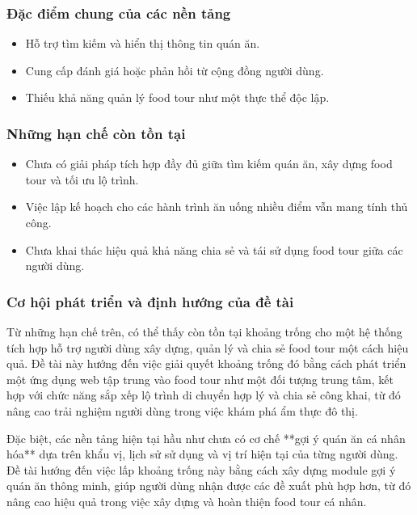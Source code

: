 \subsubsection{Đặc điểm chung của các nền tảng}
\begin{itemize}[label=\textbullet]
    \item Hỗ trợ tìm kiếm và hiển thị thông tin quán ăn.
    \item Cung cấp đánh giá hoặc phản hồi từ cộng đồng người dùng.
    \item Thiếu khả năng quản lý food tour như một thực thể độc lập.
\end{itemize}
\subsubsection{Những hạn chế còn tồn tại}
\begin{itemize}[label=\textbullet]
    \item Chưa có giải pháp tích hợp đầy đủ giữa tìm kiếm quán ăn, xây dựng food tour và tối ưu lộ trình.
    \item Việc lập kế hoạch cho các hành trình ăn uống nhiều điểm vẫn mang tính thủ công.
    \item Chưa khai thác hiệu quả khả năng chia sẻ và tái sử dụng food tour giữa các người dùng.
\end{itemize}
\subsubsection{Cơ hội phát triển và định hướng của đề tài}
Từ những hạn chế trên, có thể thấy còn tồn tại khoảng trống cho một hệ thống tích hợp hỗ trợ
người dùng xây dựng, quản lý và chia sẻ food tour một cách hiệu quả. Đề tài này hướng đến việc
giải quyết khoảng trống đó bằng cách phát triển một ứng dụng web tập trung vào food tour như
một đối tượng trung tâm, kết hợp với chức năng sắp xếp lộ trình di chuyển hợp lý và chia sẻ
công khai, từ đó nâng cao trải nghiệm người dùng trong việc khám phá ẩm thực đô thị.

Đặc biệt, các nền tảng hiện tại hầu như chưa có cơ chế **gợi ý quán ăn cá nhân hóa** dựa trên khẩu vị, lịch sử sử dụng và vị trí hiện tại của từng người dùng. Đề tài hướng đến việc lấp khoảng trống này bằng cách xây dựng module gợi ý quán ăn thông minh, giúp người dùng nhận được các đề xuất phù hợp hơn, từ đó nâng cao hiệu quả trong việc xây dựng và hoàn thiện food tour cá nhân.

